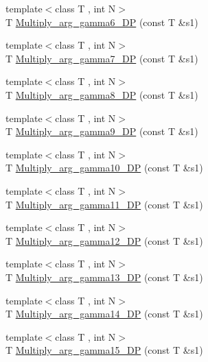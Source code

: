 \begin{DoxyCompactItemize}
\item 
{\footnotesize template$<$class T , int N$>$ }\\T \mbox{\hyperlink{namespaceENSEM_ae1c5c19c0bc38e6a6ab6ef8c654af325}{Multiply\+\_\+arg\+\_\+gamma6\+\_\+\+DP}} (const T \&s1)
\item 
{\footnotesize template$<$class T , int N$>$ }\\T \mbox{\hyperlink{namespaceENSEM_af8d5b6d451f6dbfcb8267d716e45f849}{Multiply\+\_\+arg\+\_\+gamma7\+\_\+\+DP}} (const T \&s1)
\item 
{\footnotesize template$<$class T , int N$>$ }\\T \mbox{\hyperlink{namespaceENSEM_acf415cfb4423b511f1bf7c4531c24eda}{Multiply\+\_\+arg\+\_\+gamma8\+\_\+\+DP}} (const T \&s1)
\item 
{\footnotesize template$<$class T , int N$>$ }\\T \mbox{\hyperlink{namespaceENSEM_a223eca565597626d30b331276e97c32d}{Multiply\+\_\+arg\+\_\+gamma9\+\_\+\+DP}} (const T \&s1)
\item 
{\footnotesize template$<$class T , int N$>$ }\\T \mbox{\hyperlink{namespaceENSEM_af4e553a9453429a592725dd4ab7a6b1d}{Multiply\+\_\+arg\+\_\+gamma10\+\_\+\+DP}} (const T \&s1)
\item 
{\footnotesize template$<$class T , int N$>$ }\\T \mbox{\hyperlink{namespaceENSEM_acc18dd51105f008d99800a117f284872}{Multiply\+\_\+arg\+\_\+gamma11\+\_\+\+DP}} (const T \&s1)
\item 
{\footnotesize template$<$class T , int N$>$ }\\T \mbox{\hyperlink{namespaceENSEM_adb0071f13d0d62199ef3077b2f9d1c41}{Multiply\+\_\+arg\+\_\+gamma12\+\_\+\+DP}} (const T \&s1)
\item 
{\footnotesize template$<$class T , int N$>$ }\\T \mbox{\hyperlink{namespaceENSEM_a124549d43453b8c8fe7d8d501c0aadbf}{Multiply\+\_\+arg\+\_\+gamma13\+\_\+\+DP}} (const T \&s1)
\item 
{\footnotesize template$<$class T , int N$>$ }\\T \mbox{\hyperlink{namespaceENSEM_a6ccb5e56860592ee24e7da603a522c7a}{Multiply\+\_\+arg\+\_\+gamma14\+\_\+\+DP}} (const T \&s1)
\item 
{\footnotesize template$<$class T , int N$>$ }\\T \mbox{\hyperlink{namespaceENSEM_ab24a3a41aeb943ec71c06de029e9540b}{Multiply\+\_\+arg\+\_\+gamma15\+\_\+\+DP}} (const T \&s1)

\end{DoxyCompactItemize}
